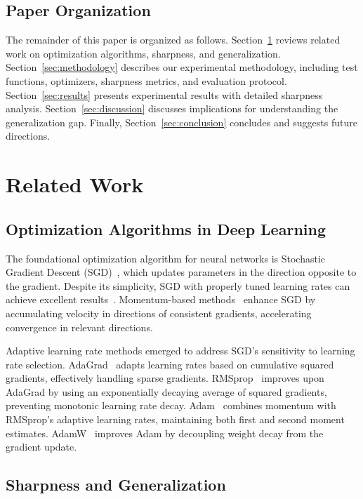 \documentclass[12pt,a4paper]{article}
\begin{document}
\subsection{Paper Organization}

The remainder of this paper is organized as follows. Section~\ref{sec:related} reviews related work on optimization algorithms, sharpness, and generalization. Section~\ref{sec:methodology} describes our experimental methodology, including test functions, optimizers, sharpness metrics, and evaluation protocol. Section~\ref{sec:results} presents experimental results with detailed sharpness analysis. Section~\ref{sec:discussion} discusses implications for understanding the generalization gap. Finally, Section~\ref{sec:conclusion} concludes and suggests future directions.

\section{Related Work}
\label{sec:related}

\subsection{Optimization Algorithms in Deep Learning}

The foundational optimization algorithm for neural networks is Stochastic Gradient Descent (SGD)~\cite{robbins1951stochastic}, which updates parameters in the direction opposite to the gradient. Despite its simplicity, SGD with properly tuned learning rates can achieve excellent results~\cite{wilson2017marginal}. Momentum-based methods~\cite{polyak1964some,sutskever2013importance} enhance SGD by accumulating velocity in directions of consistent gradients, accelerating convergence in relevant directions.

Adaptive learning rate methods emerged to address SGD's sensitivity to learning rate selection. AdaGrad~\cite{duchi2011adaptive} adapts learning rates based on cumulative squared gradients, effectively handling sparse gradients. RMSprop~\cite{tieleman2012lecture} improves upon AdaGrad by using an exponentially decaying average of squared gradients, preventing monotonic learning rate decay. Adam~\cite{kingma2014adam} combines momentum with RMSprop's adaptive learning rates, maintaining both first and second moment estimates. AdamW~\cite{loshchilov2017decoupled} improves Adam by decoupling weight decay from the gradient update.

\subsection{Sharpness and Generalization}
\end{document}
